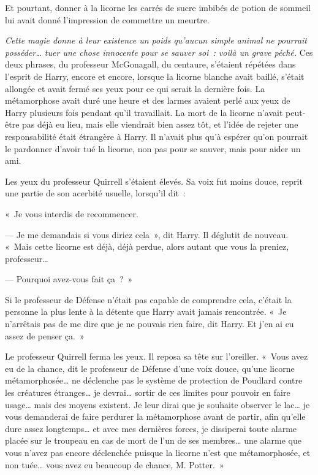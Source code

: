 Et pourtant, donner à la licorne les carrés de sucre imbibés de potion de sommeil lui avait donné l'impression de commettre un meurtre.

\emph{Cette magie donne à leur existence un poids qu'aucun simple animal ne pourrait posséder… tuer une chose innocente pour se sauver soi~: voilà un grave péché.} Ces deux phrases, du professeur McGonagall, du centaure, s'étaient répétées dans l'esprit de Harry, encore et encore, lorsque la licorne blanche avait baillé, s'était allongée et avait fermé ses yeux pour ce qui serait la dernière fois. La métamorphose avait duré une heure et des larmes avaient perlé aux yeux de Harry plusieurs fois pendant qu'il travaillait. La mort de la licorne n'avait peut-être pas déjà eu lieu, mais elle viendrait bien assez tôt, et l'idée de rejeter une responsabilité était étrangère à Harry. Il n'avait plus qu'à espérer qu'on pourrait le pardonner d'avoir tué la licorne, non pas pour se sauver, mais pour aider un ami.

Les yeux du professeur Quirrell s'étaient élevés. Sa voix fut moins douce, reprit une partie de son acerbité usuelle, lorsqu'il dit~:

«~Je vous interdis de recommencer.

--- Je me demandais si vous diriez cela~», dit Harry. Il déglutit de nouveau. «~Mais cette licorne est déjà, déjà perdue, alors autant que vous la preniez, professeur…

--- Pourquoi avez-vous fait ça~?~»

Si le professeur de Défense n'était pas capable de comprendre cela, c'était la personne la plus lente à la détente que Harry avait jamais rencontrée. «~Je n'arrêtais pas de me dire que je ne pouvais rien faire, dit Harry. Et j'en ai eu assez de penser ça.~»

Le professeur Quirrell ferma les yeux. Il reposa sa tête sur l'oreiller. «~Vous avez eu de la chance, dit le professeur de Défense d'une voix douce, qu'une licorne métamorphosée… ne déclenche pas le système de protection de Poudlard contre les créatures étranges… je devrai… sortir de ces limites pour pouvoir en faire usage… mais des moyens existent. Je leur dirai que je souhaite observer le lac… je vous demanderai de faire perdurer la métamorphose avant de partir, afin qu'elle dure assez longtemps… et avec mes dernières forces, je dissiperai toute alarme placée sur le troupeau en cas de mort de l'un de ses membres… une alarme que vous n'avez pas encore déclenchée puisque la licorne n'est que métamorphosée, et non tuée… vous avez eu beaucoup de chance, M. Potter.~»

